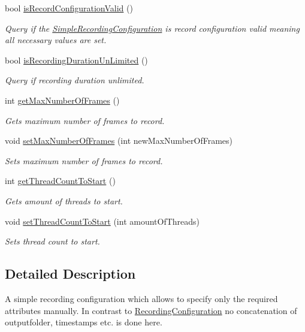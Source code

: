 \begin{DoxyCompactItemize}
bool \hyperlink{class_simple_recording_configuration_aa62572bce9d1031272ef1e2e43d8f524}{is\+Record\+Configuration\+Valid} ()
\begin{DoxyCompactList}\small\item\em Query if the \hyperlink{class_simple_recording_configuration}{Simple\+Recording\+Configuration} is record configuration valid meaning all necessary values are set. \end{DoxyCompactList}\item 
bool \hyperlink{class_simple_recording_configuration_a87d0cf9356d24d1c6c7bb1bd6ad238ad}{is\+Recording\+Duration\+Un\+Limited} ()
\begin{DoxyCompactList}\small\item\em Query if recording duration unlimited. \end{DoxyCompactList}\item 
int \hyperlink{class_simple_recording_configuration_a571a390604684c9b5de9467e12e23c43}{get\+Max\+Number\+Of\+Frames} ()
\begin{DoxyCompactList}\small\item\em Gets maximum number of frames to record. \end{DoxyCompactList}\item 
void \hyperlink{class_simple_recording_configuration_aecd02808bbcaf8a2b613b2d705dbcf24}{set\+Max\+Number\+Of\+Frames} (int new\+Max\+Number\+Of\+Frames)
\begin{DoxyCompactList}\small\item\em Sets maximum number of frames to record. \end{DoxyCompactList}\item 
int \hyperlink{class_simple_recording_configuration_afcd4ac5d77fc4e358746db9127186e94}{get\+Thread\+Count\+To\+Start} ()
\begin{DoxyCompactList}\small\item\em Gets amount of threads to start. \end{DoxyCompactList}\item 
void \hyperlink{class_simple_recording_configuration_a1405dd8e98b6238b9368a8c36d712b04}{set\+Thread\+Count\+To\+Start} (int amount\+Of\+Threads)
\begin{DoxyCompactList}\small\item\em Sets thread count to start. \end{DoxyCompactList}\end{DoxyCompactItemize}


\subsection{Detailed Description}
A simple recording configuration which allows to specify only the required attributes manually. In contrast to \hyperlink{class_recording_configuration}{Recording\+Configuration} no concatenation of outputfolder, timestamps etc. is done here. 

